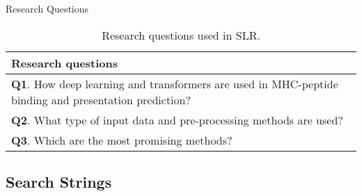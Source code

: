 \documentclass[10pt]{beamer}
\newcommand{\1}{
	\setbeamertemplate{background}{
		\texttt{[image: img/1]}
		\tikz[overlay] \fill[fill opacity=0.75,fill=white] (0,0) rectangle (-\paperwidth,\paperheight);
	}
}
\begin{document}
\begin{frame}{Research Questions}{}
		\begin{table}[h]
		\begin{center}
			\caption{Research questions used in SLR.}
			\label{tab:questions}
			\setlength{\tabcolsep}{0.5em} %
			{\renewcommand{\arraystretch}{1.4}%
				\begin{tabular}{p{8.5cm}}
					\textbf{Research questions} \\ \hline
					\textbf{Q1}. How deep learning and transformers are used in MHC-peptide binding and presentation prediction? \\
					\textbf{Q2}. What type of input data and pre-processing methods are used? \\
					\textbf{Q3}. Which are the most promising methods? \\		
				\end{tabular}
			}
		\end{center}
	\end{table}	

\end{frame}

\subsection{Search Strings}
\end{document}
